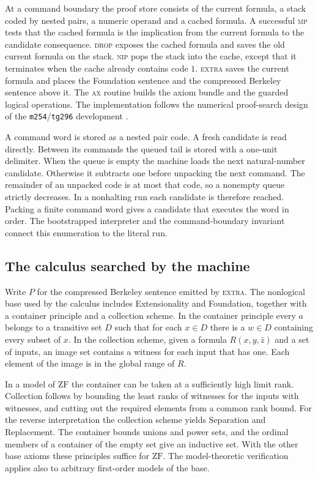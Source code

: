 \documentclass[11pt,letterpaper]{article}
\theoremstyle{definition}
\newcommand{\ZF}{\mathrm{ZF}}
\begin{document}
At a command boundary the proof store consists of the current formula,
a stack coded by nested pairs, a numeric operand and a cached formula.
A successful \textsc{mp} tests that the cached formula is the implication
from the current formula to the candidate consequence.
\textsc{drop} exposes the cached formula and saves the old current
formula on the stack. \textsc{nip} pops the stack into the cache,
except that it terminates when the cache already contains code $1$.
\textsc{extra} saves the current formula and places the Foundation
sentence and the compressed Berkeley sentence above it. The
\textsc{ax} routine builds the axiom bundle and the guarded
logical operations. The implementation follows the numerical
proof-search design of the \texttt{m254}/\texttt{tg296} development
\cite{ketchersid}.

A command word is stored as a nested pair code. A fresh candidate
is read directly. Between its commands the queued tail is stored
with a one-unit delimiter. When the queue is empty the machine
loads the next natural-number candidate. Otherwise it subtracts
one before unpacking the next command. The remainder of an
unpacked code is at most that code, so a nonempty queue strictly
decreases. In a nonhalting run each candidate is therefore reached.
Packing a finite command word gives a candidate that executes the
word in order. The bootstrapped interpreter and the command-boundary
invariant connect this enumeration to the literal run.

\subsection{The calculus searched by the machine}

Write $P$ for the compressed Berkeley sentence emitted by
\textsc{extra}. The nonlogical base used by the calculus includes
Extensionality and Foundation, together with a container principle
and a collection scheme. In the container principle every $a$
belongs to a transitive set $D$ such that for each $x\in D$ there
is a $w\in D$ containing every subset of $x$. In the collection scheme,
given a formula $R(x,y,\bar z)$ and a set of inputs, an image set
contains a witness for each input that has one. Each element of the
image is in the global range of $R$.

In a model of $\ZF$ the container can be taken at a sufficiently
high limit rank. Collection follows by bounding the least ranks
of witnesses for the inputs with witnesses, and cutting out the
required elements from a common rank bound. For the reverse
interpretation the collection scheme yields Separation and
Replacement. The container bounds unions and power sets, and the
ordinal members of a container of the empty set give an inductive
set. With the other base axioms these principles suffice for
$\ZF$. The model-theoretic verification applies also to arbitrary
first-order models of the base.
\end{document}

